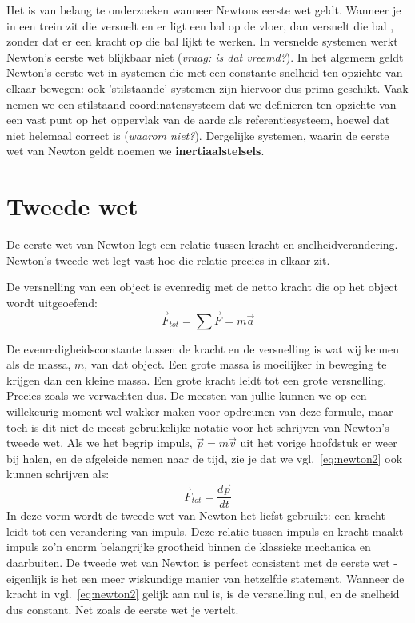Het is van belang te onderzoeken wanneer Newtons eerste wet geldt. Wanneer je in 
een trein zit die versnelt en er ligt een bal op de vloer, dan versnelt die bal , zonder dat er 
een kracht op die bal lijkt te werken. In versnelde systemen werkt Newton's eerste wet 
blijkbaar niet ({\it vraag: is dat vreemd?}). In het algemeen geldt Newton's eerste wet in systemen 
die met een constante snelheid ten opzichte van elkaar bewegen: ook 'stilstaande' systemen
zijn hiervoor dus prima geschikt. Vaak nemen we een stilstaand coordinatensysteem
dat we definieren ten opzichte van een vast punt op het oppervlak van de aarde als 
referentiesysteem, hoewel dat niet helemaal correct is ({\it waarom niet?}). Dergelijke systemen,
waarin de eerste wet van Newton geldt noemen we {\bf inertiaalstelsels}. 

\section{Tweede wet}

De eerste wet van Newton legt een relatie tussen kracht en snelheidverandering. Newton's
tweede wet legt vast hoe die relatie precies in elkaar zit.
\begin{Newton2}
De versnelling van een object is evenredig met de netto kracht die op het object wordt
uitgeoefend:
\begin{equation}\label{eq:newton2}
\vec{F}_{tot} = \sum \vec{F} = m \vec{a}
\end{equation}
\end{Newton2}
De evenredigheidsconstante tussen de kracht en de versnelling is wat wij kennen
als de massa, $m$, van dat object.  Een grote massa is moeilijker in beweging te krijgen
dan een kleine massa. Een grote kracht leidt tot een grote versnelling. Precies zoals we 
verwachten dus.  De meesten van jullie kunnen we op een willekeurig moment wel 
wakker maken voor opdreunen van deze formule, maar toch is dit niet de meest gebruikelijke
notatie voor het schrijven van Newton's tweede wet. Als we het begrip impuls, 
$\vec{p}=m\vec{v}$ uit het vorige hoofdstuk er weer bij halen, en de afgeleide nemen naar
de tijd, zie je dat we vgl.~\ref{eq:newton2} ook kunnen schrijven als:
\begin{equation}
\vec{F}_{tot} = \frac{d \vec{p}}{dt}
\end{equation}
In deze vorm wordt de tweede wet van Newton het liefst gebruikt: een kracht leidt tot
een verandering van impuls. Deze relatie tussen impuls en kracht maakt impuls zo'n enorm
belangrijke grootheid binnen de klassieke mechanica en daarbuiten. De tweede wet van Newton
is perfect consistent met  de eerste wet - eigenlijk is het een meer wiskundige manier van hetzelfde
statement. Wanneer de kracht in vgl.~\ref{eq:newton2} gelijk aan nul is, is de versnelling
nul, en de snelheid dus constant. Net zoals de eerste wet je vertelt.

